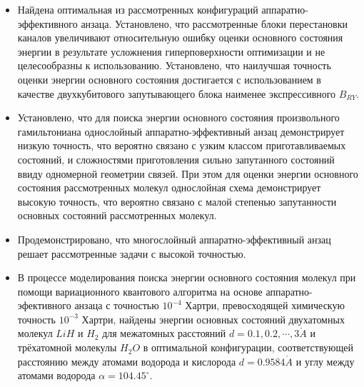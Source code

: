 \documentclass[14pt]{extarticle}
\begin{document}
\begin{itemize}

\item Найдена оптимальная из рассмотренных конфигураций аппаратно-эффективного анзаца. Установлено, что рассмотренные блоки перестановки каналов увеличивают относительную ошибку оценки основного состояния энергии в результате усложнения гиперповерхности оптимизации и не целесообразны к использованию. Установлено, что наилучшая точность оценки энергии основного состояния достигается с использованием в качестве двухкубитового запутывающего блока наименее экспрессивного $B_{RY}$.

\item Установлено, что для поиска энергии основного состояния произвольного гамильтониана  однослойный аппаратно-эффективный анзац демонстрирует низкую точность, что вероятно связано с узким классом приготавливаемых состояний, и сложностями приготовления сильно запутанного состояний ввиду одномерной геометрии связей. При этом для оценки энергии основного состояния рассмотренных молекул однослойная схема демонстрирует высокую точность, что вероятно связано с малой степенью запутанности основных состояний рассмотренных молекул.

\item Продемонстрировано, что многослойный аппаратно-эффективный анзац решает рассмотренные задачи с высокой точностью.

\item В процессе моделирования поиска энергии основного состояния молекул при помощи вариационного квантового алгоритма на основе аппаратно-эфективного анзаца с точностью $10^{-4}$ Хартри, превосходящей химическую точность $10^{-3}$ Хартри, найдены энергии основных состояний двухатомных молекул $LiH$ и $H_2$ для межатомных расстояний $d = 0.1, 0.2, \cdots , 3 \mathring A$ и трёхатомной молекулы $H_2O$ в оптимальной конфигурации, соответствующей расстоянию между атомами водорода и кислорода $d = 0.9584 \mathring A$ и углу между атомами водорода $\alpha = 104.45^{\circ}$.
\end{itemize}

\newpage



\end{document}
